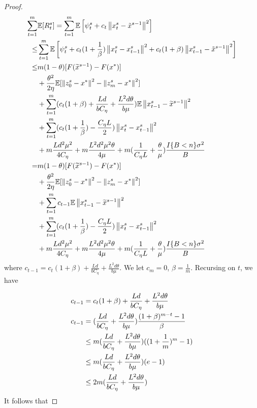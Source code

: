 \documentclass{article}
\newcommand*{\E}{\mathbb{E}}
\newcommand{\norm}[1]{\left\lVert#1\right\rVert}
\theoremstyle{definition}
\theoremstyle{remark}
\begin{document}
{\begin{proof}
\begin{align}
\sum_{t=1}^{m}& \E[R_{t}^s] = \sum_{t=1}^{m}\E\left[\psi_{t}^s+ c_{t}\norm{x_{t}^s-\tilde{x}^{s-1}}^2\right]\notag\\
\leq& \sum_{t=1}^{m}\E\left[\psi_{t}^s+ c_{t}(1+\frac{1}{\beta})\norm{x_{t}^s-x_{t-1}^s}^2+ c_{t}(1+{\beta})\norm{x_{t-1}^s-\tilde{x}^{s-1}}^2\right]\\
\leq & m(1-\theta)[F(\widetilde{x}^{s-1})-F(x^*)]\notag \\
&+ {\frac{ \theta^2}{2\eta}}\E[\norm{z_{0}^s-x^*}^2-\norm{z_{m}^s-x^*}^2]\notag\\
&+ \sum_{t=1}^{m} (c_{t}(1+{\beta})+\frac{Ld}{bC_{\eta}}+\frac{L^2d\theta}{b\mu})\E\norm{x_{t-1}^s-\widetilde{x}^{s-1}}^2\notag\\
&+\sum_{t=1}^{m}(c_{t}(1+\frac{1}{\beta})-\frac{C_{\eta} L}{2})\norm{x_{t}^s-x_{t-1}^s}^2\notag\\
&+m\frac{Ld^2\mu^2}{4C_{\eta}}+m\frac{ L^2d^2\mu^2\theta}{4\mu}+m(\frac{1}{C_{\eta} L}+\frac{\theta}{\mu})\frac{I\{B < n\} \sigma ^2}{B}\\
= & m(1-\theta)[F(\widetilde{x}^{s-1})-F(x^*)]\notag\\
&+ {\frac{ \theta^2}{2\eta}}\E[\norm{z_{0}^s-x^*}^2-\norm{z_{m}^s-x^*}^2]\notag\\
&+ \sum_{t=1}^{m} c_{t-1}\E\norm{x_{t-1}^s-\widetilde{x}^{s-1}}^2\notag\\
&+\sum_{t=1}^{m}(c_{t}(1+\frac{1}{\beta})-\frac{C_{\eta} L}{2})\norm{x_{t}^s-x_{t-1}^s}^2\notag\\
&+m\frac{Ld^2\mu^2}{4C_{\eta}}+m\frac{ L^2d^2\mu^2\theta}{4\mu}+m(\frac{1}{C_{\eta} L}+\frac{\theta}{\mu})\frac{I\{B < n\} \sigma ^2}{B}
\end{align}
where $c_{t-1} = c_{t}(1+{\beta})+\frac{Ld}{bC_{\eta}}+\frac{L^2d\theta}{b\mu}$. {\color{red} We let $c_m=0$, $\beta=\frac{1}{m}$}. Recursing on $t$, we have 

\begin{align}
c_{t-1} &= c_{t}(1+{\beta})+\frac{Ld}{bC_{\eta}}+\frac{L^2d\theta}{b\mu} \notag\\
c_{t-1} &= (\frac{Ld}{bC_{\eta}}+\frac{L^2d\theta}{b\mu }) \frac{(1+\beta)^{m-t}-1}{\beta} \notag\\
&\leq m(\frac{Ld}{bC_{\eta}}+\frac{L^2d\theta}{b\mu })((1+\frac{1}{m})^m-1)\notag\\
&\leq m(\frac{Ld}{bC_{\eta} }+\frac{L^2d\theta}{b\mu })(e-1)\\
&\leq 2m(\frac{Ld}{bC_{\eta} }+\frac{L^2d\theta}{b\mu })
\end{align}
It follows that 


\end{proof}}
\end{document}
